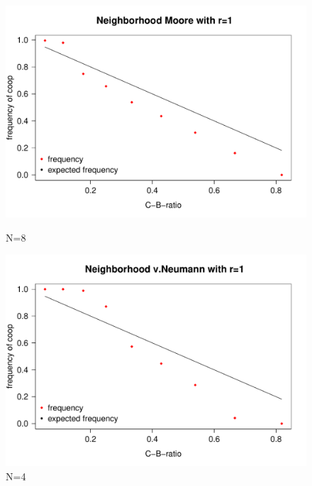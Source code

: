\documentclass[DIV=calc, paper=a4, fontsize=11pt, twocolumn]{scrartcl}	 %
\begin{document}
\begin{figure}[here]
\centering
\begin{minipage}{.40\textwidth}
  \centering
  \includegraphics[width=1\linewidth]{HDm1}
 \caption{N=8}
\label{fig:HDm1}
\end{minipage}%

\begin{minipage}{.40\textwidth}
  \centering
  \includegraphics[width=1\linewidth]{HDn1}
 \caption{N=4}
\label{fig:HDn1}
\end{minipage}%


\end{figure}
\end{document}
